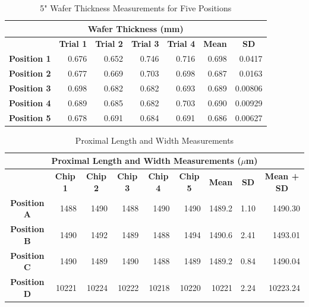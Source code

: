 \documentclass[12pt]{article}
\numberwithin{equation}{section}
\numberwithin{table}{section}
\numberwithin{figure}{section}
\begin{document}
\begin{table}[]
\centering
\caption{5" Wafer Thickness Measurements for Five Positions}\label{Thickness}
\begin{tabular}{@{}crrrrrr@{}}
\toprule
\multicolumn{7}{c}{\textbf{Wafer Thickness (mm)}}                                                                                                                                                                                                                           \\ \midrule
                    & \multicolumn{1}{c}{\textbf{Trial 1}} & \multicolumn{1}{c}{\textbf{Trial 2}} & \multicolumn{1}{c}{\textbf{Trial 3}} & \multicolumn{1}{c}{\textbf{Trial 4}} & \multicolumn{1}{c}{\textbf{Mean}} & \multicolumn{1}{c}{\textbf{SD}} \\
\textbf{Position 1} & 0.676 & 0.652 & 0.746 & 0.716 & 0.698 & 0.0417 \\
\textbf{Position 2} & 0.677 & 0.669 & 0.703 & 0.698 & 0.687 & 0.0163 \\
\textbf{Position 3} & 0.698 & 0.682 & 0.682 & 0.693 & 0.689 & 0.00806 \\
\textbf{Position 4} & 0.689 & 0.685 & 0.682 & 0.703 & 0.690 & 0.00929 \\
\textbf{Position 5} & 0.678 & 0.691 & 0.684 & 0.691 & 0.686 & 0.00627 \\ \bottomrule
\end{tabular}

\end{table}


\begin{table}[]
\centering
\caption{Proximal Length and Width Measurements }
\label{PLW}
\begin{tabular}{@{}crrrrrrrr@{}}
\toprule
\multicolumn{9}{c}{\textbf{Proximal Length and Width Measurements ($\mu$m)}}                                                                                                                                                                                                                                                                                   \\ \midrule
\multicolumn{1}{l}{} & \multicolumn{1}{c}{\textbf{Chip 1}} & \multicolumn{1}{c}{\textbf{Chip 2}} & \multicolumn{1}{c}{\textbf{Chip 3}} & \multicolumn{1}{c}{\textbf{Chip 4}} & \multicolumn{1}{c}{\textbf{Chip 5}} & \multicolumn{1}{c}{\textbf{Mean}} & \multicolumn{1}{c}{\textbf{SD}} & \multicolumn{1}{c}{\textbf{Mean + SD}} \\
\textbf{Position A}  & 1488  & 1490  & 1488  & 1490  & 1490 & 1489.2  & 1.10 & 1490.30 \\
\textbf{Position B}  & 1490  & 1492  & 1489  & 1488  & 1494 & 1490.6  & 2.41 & 1493.01 \\
\textbf{Position C}  & 1490  & 1489  & 1490  & 1488  & 1489 & 1489.2  & 0.84 & 1490.04 \\
\textbf{Position D}  & 10221 & 10224 & 10222 & 10218 & 10220 & 10221 & 2.24 & 10223.24 \\ \bottomrule
\end{tabular}
\end{table}
\end{document}
